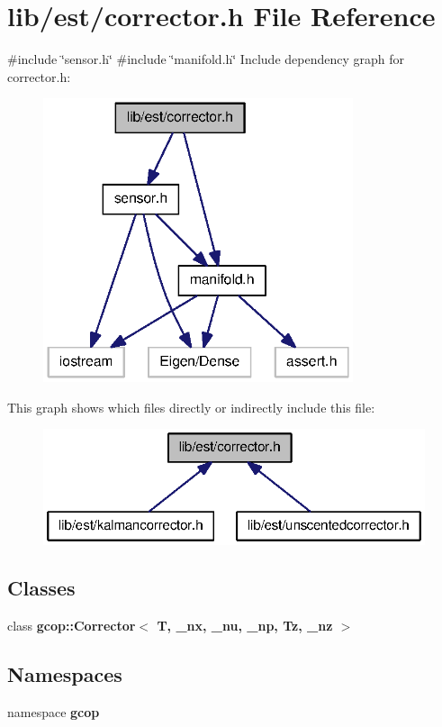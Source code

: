 \section{lib/est/corrector.h \-File \-Reference}
\label{corrector_8h}
{\ttfamily \#include \char`\"{}sensor.\-h\char`\"{}}\*
{\ttfamily \#include \char`\"{}manifold.\-h\char`\"{}}\*
\-Include dependency graph for corrector.\-h\-:
\nopagebreak
\begin{figure}[H]
\begin{center}
\leavevmode
\includegraphics[width=258pt]{corrector_8h__incl}
\end{center}
\end{figure}
\-This graph shows which files directly or indirectly include this file\-:
\nopagebreak
\begin{figure}[H]
\begin{center}
\leavevmode
\includegraphics[width=322pt]{corrector_8h__dep__incl}
\end{center}
\end{figure}
\subsection*{\-Classes}
\begin{DoxyCompactItemize}
\item 
class {\bf gcop\-::\-Corrector$<$ T, \-\_\-nx, \-\_\-nu, \-\_\-np, Tz, \-\_\-nz $>$}
\end{DoxyCompactItemize}
\subsection*{\-Namespaces}
\begin{DoxyCompactItemize}
\item 
namespace {\bf gcop}
\end{DoxyCompactItemize}
